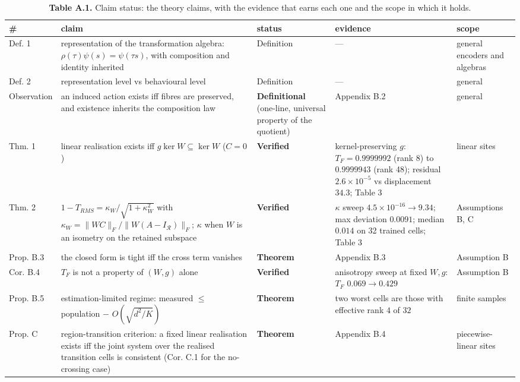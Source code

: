 \begin{table}[t]
\centering
\scriptsize
\caption*{\textbf{Table A.1.} Claim status: the theory claims, with the evidence that earns each one and the scope in which it holds.}
\setlength{\tabcolsep}{2pt}
\begin{tabularx}{\textwidth}{@{}>{\raggedright\arraybackslash}X >{\raggedright\arraybackslash}X >{\raggedright\arraybackslash}X >{\raggedright\arraybackslash}X >{\raggedright\arraybackslash}X@{}}
\toprule
\textbf{\#} & \textbf{claim} & \textbf{status} & \textbf{evidence} & \textbf{scope} \\
\midrule
Def. 1 & representation of the transformation algebra: $\rho(\tau)\psi(s)=\psi(\tau s)$, with composition and identity inherited & Definition & --- & general encoders and algebras \\
Def. 2 & representation level vs behavioural level & Definition & --- & general \\
Observation & an induced action exists iff fibres are preserved, and existence inherits the composition law & \textbf{Definitional} (one-line, universal property of the quotient) & Appendix B.2 & general \\
Thm. 1 & linear realisation exists iff $g\ker W\subseteq\ker W$ ($C=0$) & \textbf{Verified} & kernel-preserving $g$: $T_F=0.9999992$ (rank 8) to $0.9999943$ (rank 48); residual $2.6\times10^{-5}$ vs displacement $34.3$; Table 3 & linear sites \\
Thm. 2 & $1-T_{RMS}=\kappa_W/\sqrt{1+\kappa_W^2}$ with $\kappa_W=\lVert WC\rVert_F/\lVert W(A-I_{\mathcal R})\rVert_F$; $\kappa$ when $W$ is an isometry on the retained subspace & \textbf{Verified} & $\kappa$ sweep $4.5\times10^{-16}\to9.34$; max deviation $0.0091$; median $0.014$ on 32 trained cells; Table 3 & Assumptions B, C \\
Prop. B.3 & the closed form is tight iff the cross term vanishes & \textbf{Theorem} & Appendix B.3 & Assumption B \\
Cor. B.4 & $T_F$ is not a property of $(W,\allowbreak{}g)$ alone & \textbf{Verified} & anisotropy sweep at fixed $W,\allowbreak{}g$: $T_F$ $0.069\to0.429$ & Assumption B \\
Prop. B.5 & estimation-limited regime: measured $\le$ population $-$ $O(\sqrt{d^2/K})$ & \textbf{Theorem} & two worst cells are those with effective rank $4$ of $32$ & finite samples \\
Prop. C & region-transition criterion: a fixed linear realisation exists iff the joint system over the realised transition cells is consistent (Cor. C.1 for the no-crossing case) & \textbf{Theorem} & Appendix B.4 & piecewise-linear sites \\

\end{tabularx}
\end{table}
